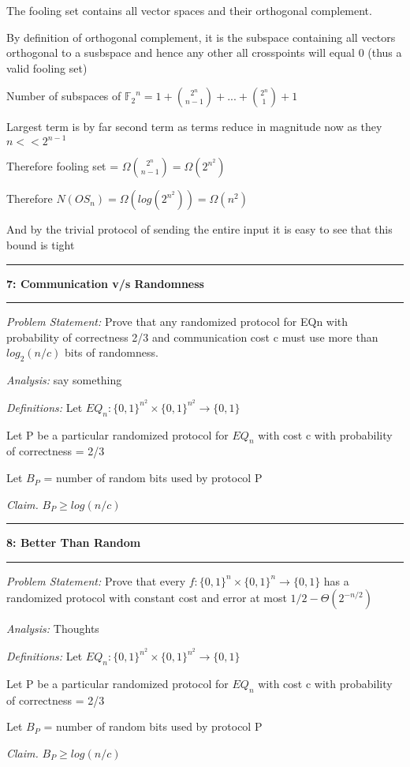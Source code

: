 \documentclass[11pt]{article}
\newcommand\question[2]{\vspace{.25in}\hrule\textbf{#1: #2}\vspace{.5em}\hrule\vspace{.10in}}
\newcommand\analysis{\vspace{.10in}\emph{Analysis: }\newline}
\newcommand\problem{\emph{Problem Statement:}\newline}
\newcommand\definitions{\emph{Definitions:}\newline}
\newcommand\claim{\emph{Claim.}\newline}
\begin{document}
The fooling set contains all vector spaces and their orthogonal complement. 

By definition of orthogonal complement, it is the subspace containing all vectors orthogonal to a susbspace and hence any other all crosspoints will equal 0 (thus a valid fooling set)

Number of subspaces of ${\mathbb{F}_2}^n = 1 + {2^n \choose n - 1} + ... + {2^n \choose 1} + 1$

Largest term is by far second term as terms reduce in magnitude now as they $n << 2^{n-1}$

Therefore fooling set = $\Omega{2^n \choose n - 1} = \Omega({2^{n^2}})$

Therefore $N(OS_n) = \Omega(log(2^{n^2})) = \Omega(n^2)$

And by the trivial protocol of sending the entire input it is easy to see that this bound is tight
\newpage

\question{7}{Communication v/s Randomness}

\problem
Prove that any randomized protocol for EQn with probability of correctness 2/3 and communication cost c must use more than $log_2(n/c)$ bits of randomness.

\analysis
say something

\definitions
Let $EQ_n: {\{0, 1\}}^{n^2} \times {\{0, 1\}}^{n^2} \to \{0, 1\}$

Let P be a particular randomized protocol for $EQ_n$ with cost c with probability of correctness = 2/3

Let $B_P$ = number of random bits used by protocol P 

\claim
$B_{P} \geq log(n/c)$

\proof 

\newpage
\question{8}{Better Than Random}

\problem
Prove that every $f : {\{0, 1\}}^n \times {\{0, 1\}}^n \to \{0, 1\}$ has a randomized protocol with constant cost and error at most $1/2 - \Theta(2^{-n/2})$

\analysis
Thoughts

\definitions
Let $EQ_n: {\{0, 1\}}^{n^2} \times {\{0, 1\}}^{n^2} \to \{0, 1\}$

Let P be a particular randomized protocol for $EQ_n$ with cost c with probability of correctness = 2/3

Let $B_P$ = number of random bits used by protocol P 

\claim
$B_{P} \geq log(n/c)$
\end{document}

